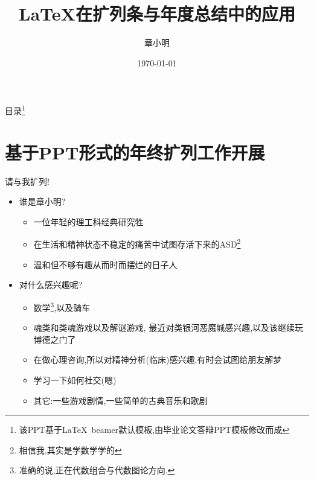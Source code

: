 \documentclass{beamer}
\title{\LaTeX 在扩列条与年度总结中的应用}
\author{章小明}
\date{\today}
\begin{document}
\maketitle
\begin{frame}{目录\footnote{该PPT基于\LaTeX\, beamer默认模板,由毕业论文答辩PPT模板修改而成}}
    \tableofcontents
\end{frame}

\section{基于PPT形式的年终扩列工作开展}
\begin{frame}{请与我扩列!}
    \begin{itemize}
        \item 谁是章小明?
        \begin{itemize}
            \item 一位年轻的理工科经典研究牲
            \item 在生活和精神状态不稳定的痛苦中试图存活下来的ASD\footnote{相信我,其实是学数学学的}
            \item 温和但不够有趣从而时而摆烂的日子人
        \end{itemize}
        \item 对什么感兴趣呢?
        \begin{itemize}
            \item 数学\footnote{准确的说,正在代数组合与代数图论方向.},以及骑车
            \item 魂类和类魂游戏以及解谜游戏, 最近对类银河恶魔城感兴趣,以及该继续玩博德之门了
            \item 在做心理咨询,所以对精神分析(临床)感兴趣,有时会试图给朋友解梦
            \item 学习一下如何社交(嗯)
            \item 其它:一些游戏剧情,一些简单的古典音乐和歌剧
        \end{itemize}
    \end{itemize}
\end{frame}
\end{document}
